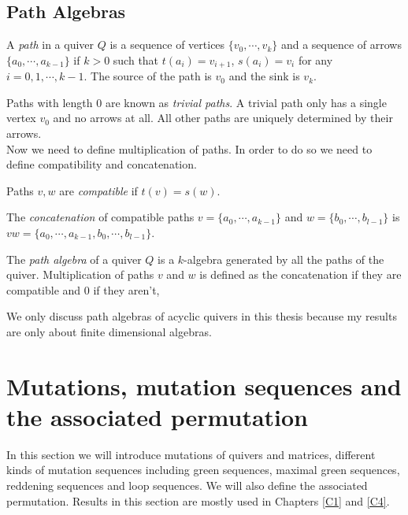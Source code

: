 \subsection{Path Algebras}
\begin{definition}
A \textit{path} in a quiver $Q$ is a sequence of vertices $\{v_0,\cdots, v_k\}$ and a sequence of arrows $\{a_0,\cdots, a_{k-1}\}$ if $k>0$ such that $t(a_i) = v_{i+1}$, $ s(a_i) = v_i$ for any $i = 0,1,\cdots, k-1$. The source of the path is $v_0$ and the sink is $v_k$.
\end{definition}
\indent Paths with length 0 are known as \textit{trivial paths}. A trivial path only has a single vertex $v_0$ and no arrows at all. All other paths are uniquely determined by their arrows.\\
\indent Now we need to define multiplication of paths. In order to do so we need to define compatibility and concatenation.\\
\begin{definition}
Paths $v,w$ are \textit{compatible} if $t(v) = s(w)$.
\end{definition}
\begin{definition}
The \textit{concatenation} of compatible paths $v = \{a_0,\cdots, a_{k-1}\}$ and $w = \{b_0,\cdots, b_{l-1}\}$ is  $vw = \{a_0,\cdots, a_{k-1}, b_0,\cdots, b_{l-1}\}$.
\end{definition}
\begin{definition}
The \textit{path algebra} of a quiver $Q$ is a $k$-algebra generated by all the paths of the quiver. Multiplication of paths $v$ and $w$ is defined as the concatenation if they are compatible and 0 if they aren't, 
\end{definition}
\indent We only discuss path algebras of acyclic quivers in this thesis because my results are only about finite dimensional algebras.\\
\section{Mutations, mutation sequences and the associated permutation}
\indent In this section we will introduce mutations of quivers and matrices, different kinds of mutation sequences including green sequences, maximal green sequences, reddening sequences and loop sequences. We will also define the associated permutation. Results in this section are mostly used in Chapters \ref{C1} and \ref{C4}.\\
